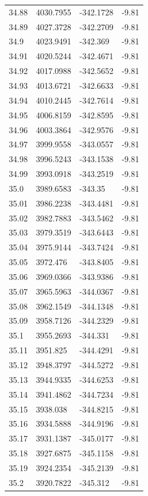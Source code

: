 \begin{table}[H]
\begin{tabular}{llll}
34.88 & 4030.7955 & -342.1728 & -9.81 \\
34.89 & 4027.3728 & -342.2709 & -9.81 \\
34.9 & 4023.9491 & -342.369 & -9.81 \\
34.91 & 4020.5244 & -342.4671 & -9.81 \\
34.92 & 4017.0988 & -342.5652 & -9.81 \\
34.93 & 4013.6721 & -342.6633 & -9.81 \\
34.94 & 4010.2445 & -342.7614 & -9.81 \\
34.95 & 4006.8159 & -342.8595 & -9.81 \\
34.96 & 4003.3864 & -342.9576 & -9.81 \\
34.97 & 3999.9558 & -343.0557 & -9.81 \\
34.98 & 3996.5243 & -343.1538 & -9.81 \\
34.99 & 3993.0918 & -343.2519 & -9.81 \\
35.0 & 3989.6583 & -343.35 & -9.81 \\
35.01 & 3986.2238 & -343.4481 & -9.81 \\
35.02 & 3982.7883 & -343.5462 & -9.81 \\
35.03 & 3979.3519 & -343.6443 & -9.81 \\
35.04 & 3975.9144 & -343.7424 & -9.81 \\
35.05 & 3972.476 & -343.8405 & -9.81 \\
35.06 & 3969.0366 & -343.9386 & -9.81 \\
35.07 & 3965.5963 & -344.0367 & -9.81 \\
35.08 & 3962.1549 & -344.1348 & -9.81 \\
35.09 & 3958.7126 & -344.2329 & -9.81 \\
35.1 & 3955.2693 & -344.331 & -9.81 \\
35.11 & 3951.825 & -344.4291 & -9.81 \\
35.12 & 3948.3797 & -344.5272 & -9.81 \\
35.13 & 3944.9335 & -344.6253 & -9.81 \\
35.14 & 3941.4862 & -344.7234 & -9.81 \\
35.15 & 3938.038 & -344.8215 & -9.81 \\
35.16 & 3934.5888 & -344.9196 & -9.81 \\
35.17 & 3931.1387 & -345.0177 & -9.81 \\
35.18 & 3927.6875 & -345.1158 & -9.81 \\
35.19 & 3924.2354 & -345.2139 & -9.81 \\
35.2 & 3920.7822 & -345.312 & -9.81 \\

\end{tabular}
\end{table}
